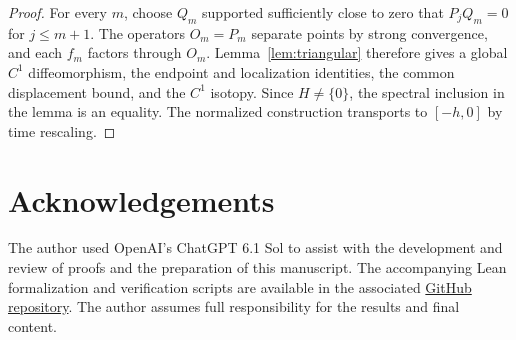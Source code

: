 \documentclass[11pt]{article}
\begin{document}
\begin{proof}
For every $m$, choose $Q_m$ supported sufficiently close to
zero that $P_jQ_m=0$ for $j\le m+1$. The operators $O_m=P_m$ separate points by
strong convergence, and each $f_m$ factors
through $O_m$. Lemma~\ref{lem:triangular}
therefore gives a global $C^1$ diffeomorphism, the
endpoint and localization identities, the common displacement
bound, and the $C^1$ isotopy. Since $H\ne\{0\}$, the spectral
inclusion in the lemma is an equality. The normalized
construction transports to $[-h,0]$ by time rescaling.
\end{proof}

\section*{Acknowledgements}

The author used OpenAI's ChatGPT 6.1 Sol
to assist with the development and review of
proofs and the preparation of this manuscript. The accompanying Lean formalization and verification
scripts are available in the associated
\href{https://github.com/kemae0/global-straightening-of-solution-manifolds}
{GitHub repository}.
The author assumes full responsibility for
the results and final content.
\end{document}
